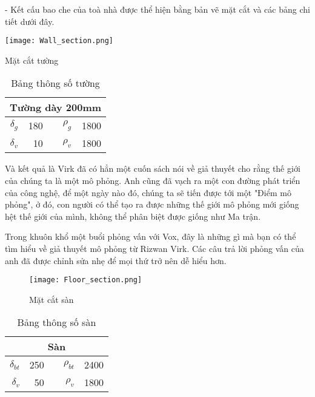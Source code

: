- Kết cấu bao che của toà nhà được thể hiện bằng bản vẽ mặt cắt và các bảng chi tiết dưới đây. 

\begin{minipage}[H]{.5\linewidth}
	\centering
	\captionsetup{type=figure}
	\texttt{[image: Wall\_section.png]}
	\caption{Mặt cắt tường}
	\label{H:tstuong}
\end{minipage}
\begin{minipage}[H]{.5\linewidth}
	\begin{table}[H]
		\centering
		\begin{tabular}{|r|r|r|r|r|}
			\toprule
			\multicolumn{5}{|c|}{\textbf{Tường dày 200mm}} \\
			\midrule
			{\LARGE $\delta_{g}$} & 180   &       & {\LARGE $\rho_{g}$}  & 1800 \\
			\midrule
			{\LARGE $\delta_{v}$} & 10    &       & {\LARGE $\rho_{v}$}  & 1800 \\
			\bottomrule
		\end{tabular}%
		\caption{Bảng thông số tường}
		\label{B:tstuong}
	\end{table}
\end{minipage}

\vspace{0.5cm}
Và kết quả là Virk đã có hẳn một cuốn sách nói về giả thuyết cho rằng thế giới của chúng ta là một mô phỏng. Anh cũng đã vạch ra một con đường phát triển của công nghệ, để một ngày nào đó, chúng ta sẽ tiến được tới một "Điểm mô phỏng", ở đó, con người có thể tạo ra được những thế giới mô phỏng mới giống hệt thế giới của mình, không thể phân biệt được giống như Ma trận.

Trong khuôn khổ một buổi phỏng vấn với Vox, đây là những gì mà bạn có thể tìm hiểu về giả thuyết mô phỏng từ Rizwan Virk. Các câu trả lời phỏng vấn của anh đã được chỉnh sửa nhẹ để mọi thứ trở nên dễ hiểu hơn.



\begin{figure}[H]
		\centering
		\texttt{[image: Floor\_section.png]}
		\caption{Mặt cắt sàn}
		\label{H:tssan}
\end{figure}

\begin{wraptable}{l}{0.35\textwidth}
		\centering
		\begin{tabular}{|r|r|r|r|r|}
			\toprule
			\multicolumn{5}{|c|}{\textbf{Sàn}} \\
			\midrule
			{\LARGE $\delta_{bt}$} & 250 &      & {\LARGE $\rho_{bt}$} & 2400 \\
			\midrule
			{\LARGE $\delta_{v}$} & 50   &      & {\LARGE $\rho_{v}$} & 1800 \\
			\bottomrule
		\end{tabular}%
		\caption{Bảng thông số sàn}
		\label{B:tssan}%
\end{wraptable}


